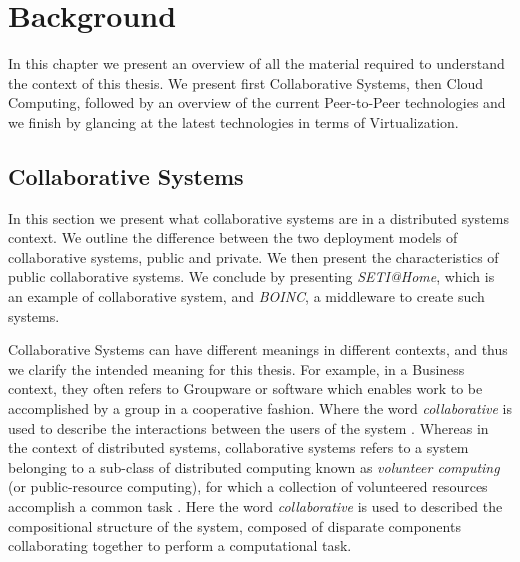 \documentclass[12pt, titlepage]{uo_temp}
\begin{document}
     \chapter{Background}
     In this chapter we present an overview of all the material required to understand the
     context of this thesis. We present first Collaborative Systems, then
     Cloud Computing, followed by an overview of the current Peer-to-Peer technologies and
     we finish by glancing at the latest technologies in terms of Virtualization.
     
     \section{Collaborative Systems}\label{bkg_collab}
     In this section we present what collaborative systems are in a distributed systems
     context. We outline the difference between the two deployment models of collaborative
     systems, public and private. We then present the characteristics of public
     collaborative systems. We conclude by presenting \emph{SETI@Home}, which is an
     example of collaborative system, and \emph{BOINC}, a middleware to create such
     systems.
     
     Collaborative Systems can have different meanings in different contexts, and thus we
     clarify the intended meaning for this thesis. 
     For example, in a Business context, they often refers to Groupware or software which
     enables work to be accomplished by a group in a cooperative fashion. Where the word
     \emph{collaborative} is used to describe the interactions between the users of the
     system \cite{carstensen1999computer}.
     Whereas in the context of distributed systems, collaborative systems refers to a
     system belonging to a sub-class of distributed computing known as \emph{volunteer
       computing} (or public-resource computing), for which a collection of volunteered
     resources accomplish a common task \cite{anderson2006computational}. Here the word \emph{collaborative} is used to
     described the compositional structure of the system, composed of disparate components
     collaborating together to perform a computational task.
\end{document}
